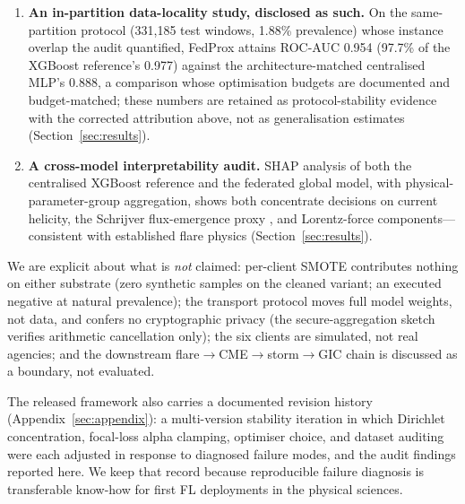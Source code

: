 \begin{enumerate}[leftmargin=2em, itemsep=3pt]
  The shipped implementation transports
  model parameters only, so BatchNorm running statistics remain at
  initialisation on the server for the entire run; under that
  evaluation the FedAvg global model drifts from 0.950 to 0.098 test
  ROC-AUC over 50 rounds, and a saturated validation monitor ($F_1
  = 2p/(1{+}p)$ whenever every prediction is positive) restores the
  collapsed round-20 checkpoint as the ``best'' model. The same
  weights score 0.951 under correct normalisation and 0.953 even at
  round 50; with BatchNorm layers removed, both FedAvg and FedProx
  train stably to near-identical test quality, so the published
  algorithm gap is substantially an evaluation-implementation
  artefact (Sections~\ref{sec:res-bn}--\ref{sec:res-nobn}).
  \item \textbf{An in-partition data-locality study, disclosed as
  such.} On the same-partition protocol (331{,}185 test windows,
  1.88\% prevalence) whose instance overlap the audit quantified,
  FedProx attains ROC-AUC 0.954 (97.7\% of the XGBoost reference's
  0.977) against the architecture-matched centralised MLP's 0.888, a
  comparison whose optimisation budgets are documented and
  budget-matched; these numbers are retained as protocol-stability
  evidence with the corrected attribution above, not as
  generalisation estimates (Section~\ref{sec:results}).
  \item \textbf{A cross-model interpretability audit.} SHAP analysis
  of both the centralised XGBoost reference and the federated global
  model, with physical-parameter-group aggregation, shows both
  concentrate decisions on current helicity, the Schrijver
  flux-emergence proxy \cite{schrijver2007}, and Lorentz-force
  components---consistent with established flare physics
  (Section~\ref{sec:results}).
\end{enumerate}

We are explicit about what is \emph{not} claimed: per-client SMOTE
contributes nothing on either substrate (zero synthetic samples on
the cleaned variant; an executed negative at natural prevalence); the
transport protocol moves full model weights, not data, and confers no
cryptographic privacy (the secure-aggregation sketch verifies
arithmetic cancellation only); the six clients are simulated, not real
agencies; and the downstream flare$\to$CME$\to$storm$\to$GIC chain
is discussed as a boundary, not evaluated.

The released framework also carries a documented revision history
(Appendix~\ref{sec:appendix}): a multi-version stability iteration in
which Dirichlet concentration, focal-loss alpha clamping, optimiser
choice, and dataset auditing were each adjusted in response to
diagnosed failure modes, and the audit findings reported here.
We keep that record because reproducible failure diagnosis is
transferable know-how for first FL deployments in the physical
sciences.

